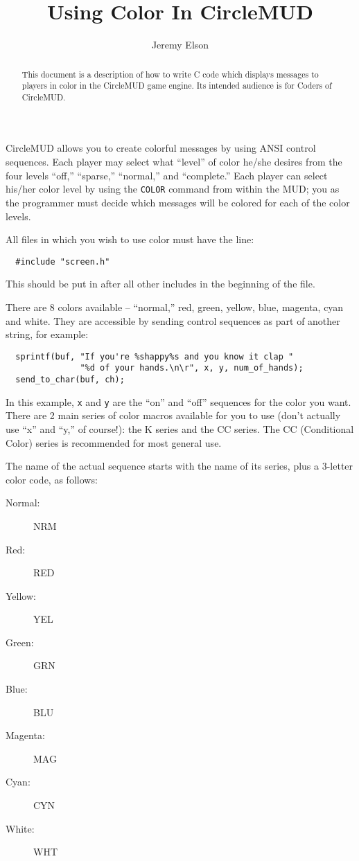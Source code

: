 \documentclass[11pt]{article}
\title{Using Color In CircleMUD}
\author{Jeremy Elson}
\begin{document}
\maketitle

\begin{abstract}
This document is a description of how to write C code which displays messages to players in color in the CircleMUD game engine.  Its intended audience is for Coders of CircleMUD.
\end{abstract}

CircleMUD allows you to create colorful messages by using ANSI control sequences.  Each player may select what ``level'' of color he/she desires from the four levels ``off,'' ``sparse,'' ``normal,'' and ``complete.''  Each player can select his/her color level by using the \texttt{COLOR} command from within the MUD; you as the programmer must decide which messages will be colored for each of the color levels.
\par
All files in which you wish to use color must have the line:
\begin{verbatim}
  #include "screen.h"
\end{verbatim}
This should be put in after all other includes in the beginning of the file.
\par
There are 8 colors available -- ``normal,'' red, green, yellow, blue, magenta, cyan and white.  They are accessible by sending control sequences as part of another string, for example:
\begin{verbatim}
  sprintf(buf, "If you're %shappy%s and you know it clap "
               "%d of your hands.\n\r", x, y, num_of_hands);
  send_to_char(buf, ch);
\end{verbatim}
In this example, \texttt{x} and \texttt{y} are the ``on'' and ``off'' sequences for the color you want.  There are 2 main series of color macros available for you to use (don't actually use ``x'' and ``y,'' of course!): the K series and the CC series. The CC (Conditional Color) series is recommended for most general use.
\par
The name of the actual sequence starts with the name of its series, plus a 3-letter color code, as follows:
\begin{description}
\item[Normal:] NRM
\item[Red:] RED
\item[Yellow:] YEL
\item[Green:] GRN
\item[Blue:] BLU
\item[Magenta:] MAG
\item[Cyan:] CYN
\item[White:] WHT
\end{description}
\end{document}
